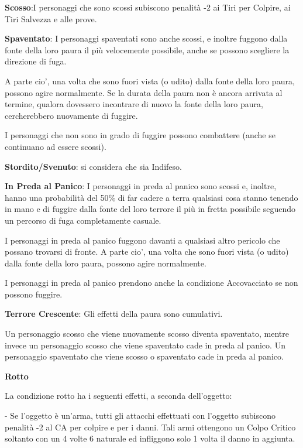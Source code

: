 \documentclass[a4paper,11pt,twoside,openany]{book}
\begin{document}
\textbf{Scosso}:I personaggi che sono scossi subiscono penalità -2 ai Tiri per Colpire, ai Tiri Salvezza e alle prove.

\textbf{Spaventato}: I personaggi spaventati sono anche scossi, e inoltre fuggono dalla fonte della loro paura il più velocemente possibile, anche se possono scegliere la direzione di fuga.

A parte cio', una volta che sono fuori vista (o udito) dalla fonte della loro paura, possono agire normalmente. Se la durata della paura non è ancora arrivata al termine, qualora dovessero incontrare di nuovo la fonte della loro paura, cercherebbero nuovamente di fuggire.

I personaggi che non sono in grado di fuggire possono combattere (anche se continuano ad essere scossi).

\textbf{Stordito/Svenuto}: si considera che sia Indifeso.

\textbf{In Preda al Panico}: I personaggi in preda al panico sono scossi e, inoltre, hanno una probabilità del 50\% di far cadere a terra qualsiasi cosa stanno tenendo in mano e di fuggire dalla fonte del loro terrore il più in fretta possibile seguendo un percorso di fuga completamente casuale.

I personaggi in preda al panico fuggono davanti a qualsiasi altro pericolo che possano trovarsi di fronte. A parte cio', una volta che sono fuori vista (o udito) dalla fonte della loro paura, possono agire normalmente.

I personaggi in preda al panico prendono anche la condizione Accovacciato se non possono fuggire.

\textbf{Terrore Crescente}: Gli effetti della paura sono cumulativi.

Un personaggio scosso che viene nuovamente scosso diventa spaventato, mentre invece un personaggio scosso che viene spaventato cade in preda al panico. Un personaggio spaventato che viene scosso o spaventato cade in preda al panico.

\textbf{Rotto}

La condizione rotto ha i seguenti effetti, a seconda dell'oggetto:

- Se l'oggetto è un'arma, tutti gli attacchi effettuati con l'oggetto subiscono penalità -2 al CA per colpire e per i danni. Tali armi ottengono un Colpo Critico soltanto con un 4 volte 6 naturale ed infliggono solo 1 volta il danno in aggiunta.
\end{document}
